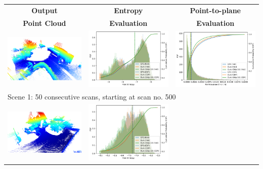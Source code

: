 \begin{table}[h]
    \centering
    {\small
        \begin{tabular}{ccc}
            \textbf{Output}                                                                            & \textbf{Entropy}    & \textbf{Point-to-plane} \\
            \textbf{Point Cloud}                                                                       & \textbf{Evaluation} & \textbf{Evaluation}     \\
            \hline \hline
            \includegraphics[width=0.3\linewidth]{images/map_eval/viz-500--50.png}                     &
            \includegraphics[width=0.31\linewidth]{images/map_eval/entropy_gps_ours_skip-500--50.pdf}  &
            \includegraphics[width=0.31\linewidth]{images/map_eval/p2plane_gps_ours_skip-500--50.pdf}                                                  \\
            \hline
            \multicolumn{3}{l}{Scene 1: 50 consecutive scans, starting at scan no. 500}                                                                \\
            \hline
            \includegraphics[width=0.3\linewidth]{images/map_eval/viz-2285--50.png}                    &
            \includegraphics[width=0.31\linewidth]{images/map_eval/entropy_gps_ours_skip-2285--50.pdf} &

\end{tabular}}
\end{table}

